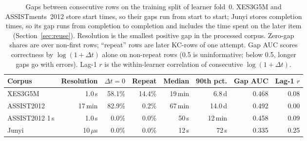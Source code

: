 \begin{table}[t]
\caption{Gaps between consecutive rows on the training split of learner
fold~0. XES3G5M and ASSISTments~2012 store start times, so their gaps
run from start to start; Junyi stores completion times, so its gap
runs from completion to completion and includes the time spent on the
later item (Section~\ref{sec:reuse}).
Resolution is the smallest positive gap in the processed corpus.
Zero-gap shares are over non-first rows; ``repeat'' rows are later
KC-rows of one attempt. Gap AUC scores correctness by $\log(1{+}\Delta t)$
alone on non-repeat rows (0.5 is uninformative; below 0.5, longer gaps
go with errors). Lag-1 $r$ is the within-learner correlation of
consecutive $\log(1{+}\Delta t)$.}
\label{tab:gap-descriptives}
\centering
\footnotesize
\setlength{\tabcolsep}{3pt}
\begin{tabular}{@{}lrrrrrrr@{}}
\toprule
Corpus & Resolution & $\Delta t{=}0$ & Repeat & Median & 90th pct. & Gap AUC & Lag-1 $r$ \\
\midrule
XES3G5M & 1.0\,s & 58.1\% & 14.4\% & 19\,min & 6.8\,d & 0.468 & 0.08 \\
ASSIST2012 & 17\,min & 82.9\% & 0.2\% & 67\,min & 14.0\,d & 0.492 & 0.00 \\
ASSIST2012 1\,s & 1.0\,s & 0.0\% & 0.0\% & 50\,s & 12\,min & 0.458 & 0.09 \\
Junyi & 10\,$\mu$s & 0.0\% & 0.0\% & 12\,s & 72\,s & 0.335 & 0.25 \\
\bottomrule
\end{tabular}
\end{table}
